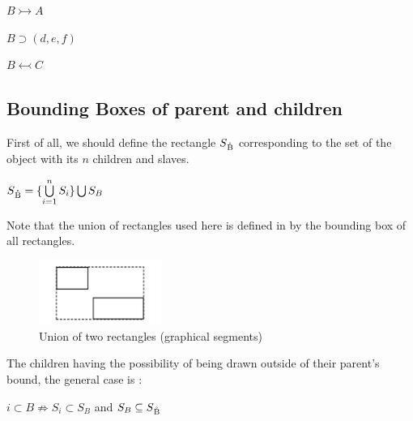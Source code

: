 \documentclass[a4paper]{article}
\newcommand{\parent}			{\supset}
\newcommand{\child}			{\subset}
\newcommand{\master}			{\leftarrowtail}
\newcommand{\slave}			{\rightarrowtail}
\begin{document}
 $B \slave A$

 $B \parent (d, e, f)$

 $B \master C$



\subsection{Bounding Boxes of parent and children}\label{subsec:bb}

First of all, we should define the rectangle $S\textsubscript{\r{B}}$ corresponding to the set of the object with its $n$ children and slaves. 

\begin{center} $ S\textsubscript{\r{B}}  =\{ \bigcup \limits_{i=1}^n S_i \} \bigcup S_B$ \end{center}

Note that the union of rectangles used here is defined in \cite{fober12cmj2} by the bounding box of all rectangles.%

\begin{figure}[h]
\centering
\includegraphics[width=40mm]{img/rect.png}
\caption{Union of two rectangles (graphical segments)}
\label{fig:rectunion}
\end{figure}

The children having the possibility of being drawn outside of their parent's bound, the general case is : 
\begin{center} $i \child B \nRightarrow S_i \subset S_B$ \hspace{0.2cm} and \hspace{0.2cm} $ S_B \subseteq S\textsubscript{\r{B}} $ \end{center}
\end{document}
